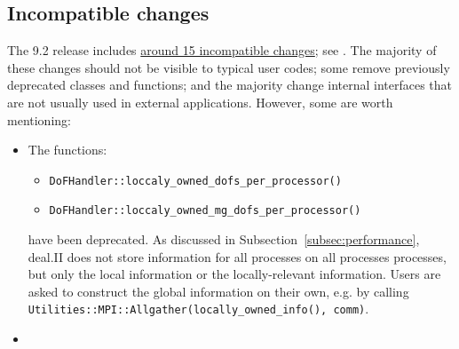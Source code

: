 \documentclass{ansarticle-preprint}
\begin{document}
\subsection{Incompatible changes}

The 9.2 release includes
\href{https://dealii.org/developer/doxygen/deal.II/changes_between_9_1_1_and_9_2_0.html}
     {around 15 incompatible changes}; see \cite{changes92}. The majority of these changes
should not be visible to typical user codes; some remove previously
deprecated classes and functions; and the majority change internal
interfaces that are not usually used in external
applications. However, some are worth mentioning:
\begin{itemize}
\item The functions:
\begin{itemize}
\item \texttt{DoFHandler::loccaly\_owned\_dofs\_per\_processor()}
\item \texttt{DoFHandler::loccaly\_owned\_mg\_dofs\_per\_processor()}
\end{itemize} have been deprecated. As discussed in Subsection~\ref{subsec:performance}, deal.II does not store information for all processes on all processes processes, but only the local information or the locally-relevant information. Users are asked to construct the global information on their own, e.g. by calling \texttt{Utilities::MPI::Allgather(locally\_owned\_info(), comm)}.
\item 

\end{itemize}
\end{document}
